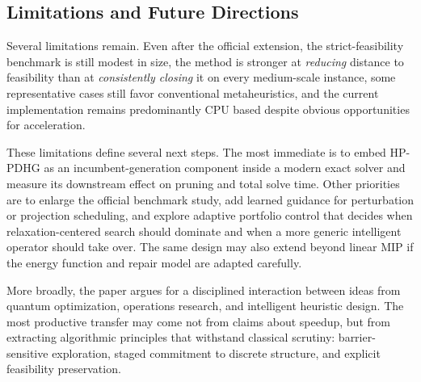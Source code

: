 \subsection{Limitations and Future Directions}
\label{subsec:impact}

Several limitations remain. Even after the official extension, the strict-feasibility benchmark is still modest in size, the method is stronger at \emph{reducing} distance to feasibility than at \emph{consistently closing} it on every medium-scale instance, some representative cases still favor conventional metaheuristics, and the current implementation remains predominantly CPU based despite obvious opportunities for acceleration.

These limitations define several next steps. The most immediate is to embed HP-PDHG as an incumbent-generation component inside a modern exact solver and measure its downstream effect on pruning and total solve time. Other priorities are to enlarge the official benchmark study, add learned guidance for perturbation or projection scheduling, and explore adaptive portfolio control that decides when relaxation-centered search should dominate and when a more generic intelligent operator should take over. The same design may also extend beyond linear MIP if the energy function and repair model are adapted carefully.

More broadly, the paper argues for a disciplined interaction between ideas from quantum optimization, operations research, and intelligent heuristic design. The most productive transfer may come not from claims about speedup, but from extracting algorithmic principles that withstand classical scrutiny: barrier-sensitive exploration, staged commitment to discrete structure, and explicit feasibility preservation.
